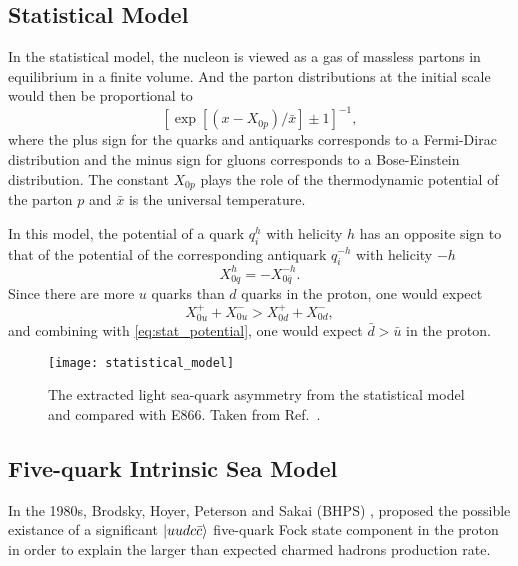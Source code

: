 \documentclass[../main.tex]{subfiles}
\begin{document}
\subsection{Statistical Model}
In the statistical model\cite{bourrely2015}, the nucleon is viewed as a gas of massless partons in equilibrium in
a finite volume. And the parton distributions at the initial scale would then be proportional to
\begin{equation}
	\left[ \exp\left[\left(x-X_{0p}\right)/\bar{x}\right] \pm 1 \right]^{-1},
\end{equation}
where the plus sign for the quarks and antiquarks corresponds to a Fermi-Dirac distribution and
the minus sign for gluons corresponds to a Bose-Einstein distribution. The constant $X_{0p}$
plays the role of the thermodynamic potential of the parton $p$ and $\bar{x}$ is the universal
temperature.

In this model, the potential of a quark $q_i^h$ with helicity $h$ has an opposite sign to that of the
potential of the corresponding antiquark $q_i^{-h}$ with helicity $-h$
\begin{equation}
	X_{0q}^h = -X_{0\bar{q}}^{-h}.
	\label{eq:stat_potential}
\end{equation}
Since there are more $u$ quarks than $d$ quarks in the proton, one would expect
\begin{equation}
	X_{0u}^+ + X_{0u}^- > X_{0d}^+ + X_{0d}^-,
\end{equation}
and combining with \cref{eq:stat_potential}, one would expect $\bar{d} > \bar{u}$ in the proton.
\begin{figure}
	\centering
	\texttt{[image: statistical\_model]}
	\caption{The extracted light sea-quark asymmetry from the statistical model and compared with E866. Taken
		from Ref.~\cite{soffer2019}.}
\end{figure}


\subsection{Five-quark Intrinsic Sea Model}
In the 1980s, Brodsky, Hoyer, Peterson and Sakai (BHPS) \cite{brodsky1980}, proposed
the possible existance of a significant $\ket{uudc\bar{c}}$ five-quark Fock state component
in the proton in order to explain the larger than expected charmed hadrons production rate.

\end{document}
